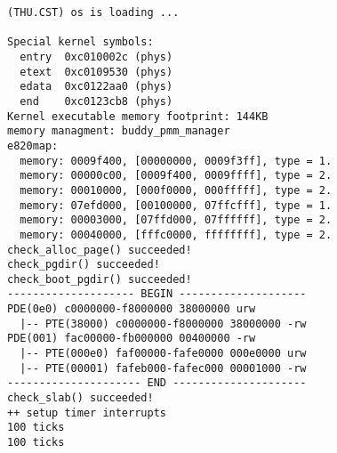 \begin{lstlisting}
(THU.CST) os is loading ...

Special kernel symbols:
  entry  0xc010002c (phys)
  etext  0xc0109530 (phys)
  edata  0xc0122aa0 (phys)
  end    0xc0123cb8 (phys)
Kernel executable memory footprint: 144KB
memory managment: buddy_pmm_manager
e820map:
  memory: 0009f400, [00000000, 0009f3ff], type = 1.
  memory: 00000c00, [0009f400, 0009ffff], type = 2.
  memory: 00010000, [000f0000, 000fffff], type = 2.
  memory: 07efd000, [00100000, 07ffcfff], type = 1.
  memory: 00003000, [07ffd000, 07ffffff], type = 2.
  memory: 00040000, [fffc0000, ffffffff], type = 2.
check_alloc_page() succeeded!
check_pgdir() succeeded!
check_boot_pgdir() succeeded!
-------------------- BEGIN --------------------
PDE(0e0) c0000000-f8000000 38000000 urw
  |-- PTE(38000) c0000000-f8000000 38000000 -rw
PDE(001) fac00000-fb000000 00400000 -rw
  |-- PTE(000e0) faf00000-fafe0000 000e0000 urw
  |-- PTE(00001) fafeb000-fafec000 00001000 -rw
--------------------- END ---------------------
check_slab() succeeded!
++ setup timer interrupts
100 ticks
100 ticks
\end{lstlisting}

